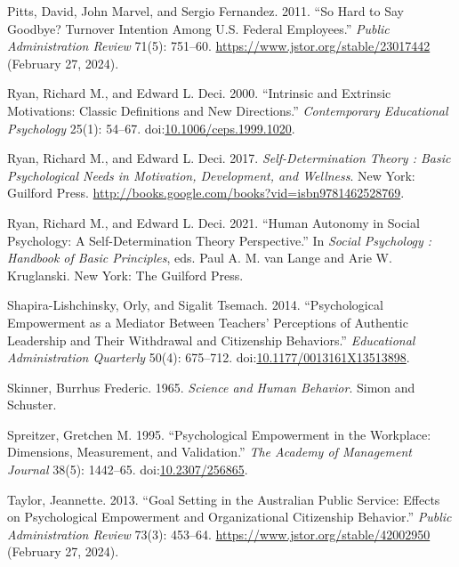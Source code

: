 \documentclass[
  11pt,
  a4paper,
]{article}
\newlength{\cslhangindent}
\newenvironment{CSLReferences}[2] %
 {\begin{list}{}{%
  \setlength{\itemindent}{0pt}
  \setlength{\leftmargin}{0pt}
  \setlength{\parsep}{0pt}
  \ifodd #1
   \setlength{\leftmargin}{\cslhangindent}
   \setlength{\itemindent}{-1\cslhangindent}
  \fi
  \setlength{\itemsep}{#2\baselineskip}}}
 {\end{list}}
\begin{document}
\begin{CSLReferences}{1}{1}
Pitts, David, John Marvel, and Sergio Fernandez. 2011. {``So {Hard} to
{Say Goodbye}? {Turnover Intention} Among {U}.{S}. {Federal
Employees}.''} \emph{Public Administration Review} 71(5): 751--60.
\url{https://www.jstor.org/stable/23017442} (February 27, 2024).

Ryan, Richard M., and Edward L. Deci. 2000. {``Intrinsic and {Extrinsic
Motivations}: {Classic Definitions} and {New Directions}.''}
\emph{Contemporary Educational Psychology} 25(1): 54--67.
doi:\href{https://doi.org/10.1006/ceps.1999.1020}{10.1006/ceps.1999.1020}.

Ryan, Richard M., and Edward L. Deci. 2017. \emph{Self-Determination
Theory : Basic Psychological Needs in Motivation, Development, and
Wellness}. New York: Guilford Press.
\url{http://books.google.com/books?vid=isbn9781462528769}.

Ryan, Richard M., and Edward L. Deci. 2021. {``Human {Autonomy} in
{Social Psychology}: {A Self-Determination Theory Perspective}.''} In
\emph{Social Psychology : Handbook of Basic Principles}, eds. Paul A. M.
van Lange and Arie W. Kruglanski. New York: The Guilford Press.

Shapira-Lishchinsky, Orly, and Sigalit Tsemach. 2014. {``Psychological
{Empowerment} as a {Mediator Between Teachers}' {Perceptions} of
{Authentic Leadership} and {Their Withdrawal} and {Citizenship
Behaviors}.''} \emph{Educational Administration Quarterly} 50(4):
675--712.
doi:\href{https://doi.org/10.1177/0013161X13513898}{10.1177/0013161X13513898}.

Skinner, Burrhus Frederic. 1965. \emph{Science and Human Behavior}.
{Simon and Schuster}.

Spreitzer, Gretchen M. 1995. {``Psychological {Empowerment} in the
{Workplace}: {Dimensions}, {Measurement}, and {Validation}.''} \emph{The
Academy of Management Journal} 38(5): 1442--65.
doi:\href{https://doi.org/10.2307/256865}{10.2307/256865}.

Taylor, Jeannette. 2013. {``Goal {Setting} in the {Australian Public
Service}: {Effects} on {Psychological Empowerment} and {Organizational
Citizenship Behavior}.''} \emph{Public Administration Review} 73(3):
453--64. \url{https://www.jstor.org/stable/42002950} (February 27,
2024).


\end{CSLReferences}
\end{document}

